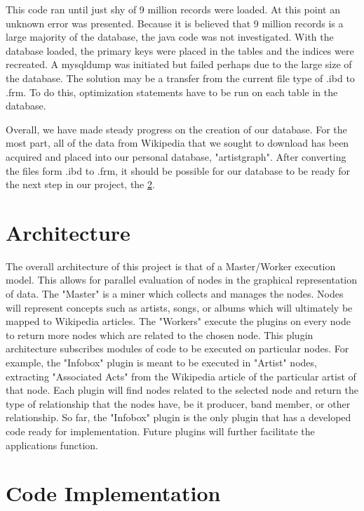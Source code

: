 \documentclass{sig-alternate}
\begin{document}
This code ran until just shy of 9 million records were loaded. At this point an unknown error
was presented. Because it is believed that 9 million records is a large majority of the
database, the java code was not investigated. With the database loaded, the primary keys
were placed in the tables and the indices were recreated. A mysqldump was initiated 
but failed perhaps due to the large size of the database. The solution may be a transfer
from the current file type of .ibd to .frm. To do this, optimization statements have to be 
run on each table in the database. 

Overall, we have made steady progress on the creation of our database. For the most part, 
all of the data from Wikipedia that we sought to download has been acquired and placed into
our personal database, "artistgraph". After converting the files form .ibd to .frm, it should
be possible for our database to be ready for the next step in our project, the
\ref{code implementation}. 

\section{Architecture}
\label{architecture}

The overall architecture of this project is that of a Master/Worker execution model. \cite{Garg:2001:TOA:558986}
This allows for parallel evaluation of nodes in the graphical representation of data. 
The "Master" is a miner which collects and manages the nodes. Nodes will represent 
concepts such as artists, songs, or albums which will ultimately be mapped to Wikipedia 
articles. The "Workers" execute the plugins on every node to return more nodes which are 
related to the chosen node. This plugin architecture subscribes modules of code to be 
executed on particular nodes. For example, the "Infobox" plugin is meant to be executed 
in "Artist" nodes, extracting "Associated Acts" from the Wikipedia article of the particular 
artist of that node. Each plugin will find nodes related to the selected node and return 
the type of relationship that the nodes have, be it producer, band member, or other relationship. 
So far, the "Infobox" plugin is the only plugin that has a developed code ready for implementation. 
Future plugins will further facilitate the applications function.

\section{Code Implementation}
\label{code implementation}
\end{document}
